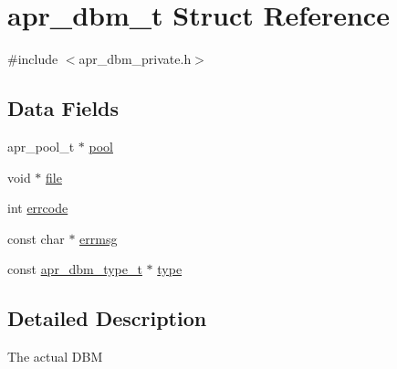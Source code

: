 \hypertarget{structapr__dbm__t}{\section{apr\-\_\-dbm\-\_\-t Struct Reference}
\label{structapr__dbm__t}
}


{\ttfamily \#include $<$apr\-\_\-dbm\-\_\-private.\-h$>$}

\subsection*{Data Fields}
\begin{DoxyCompactItemize}
\item 
apr\-\_\-pool\-\_\-t $\ast$ \hyperlink{structapr__dbm__t_af80b38e28d1504e98f9aa3308285bf9b}{pool}
\item 
void $\ast$ \hyperlink{structapr__dbm__t_a228e2548b3a034d8d16451af4b93f3f1}{file}
\item 
int \hyperlink{structapr__dbm__t_a130a628921f4c46241d09476f8a3090c}{errcode}
\item 
const char $\ast$ \hyperlink{structapr__dbm__t_adc3defc90b90fe3411c099631f75a653}{errmsg}
\item 
const \hyperlink{structapr__dbm__type__t}{apr\-\_\-dbm\-\_\-type\-\_\-t} $\ast$ \hyperlink{structapr__dbm__t_a27287213e7ebe16d9945207a13300faf}{type}
\end{DoxyCompactItemize}


\subsection{Detailed Description}
The actual D\-B\-M 

